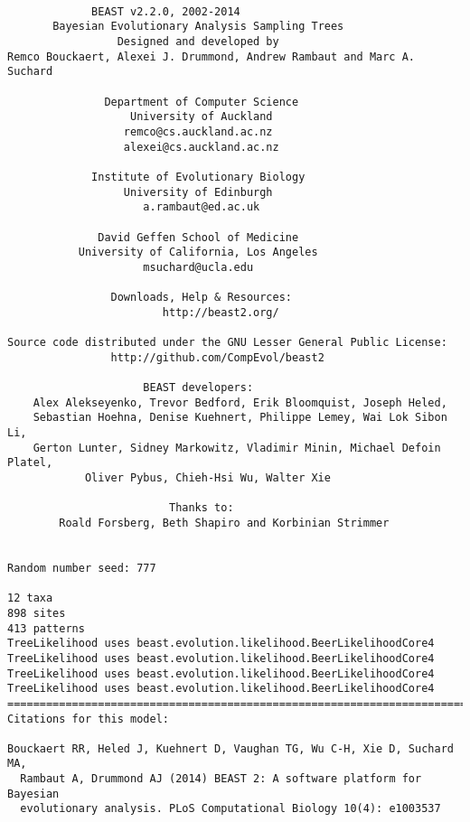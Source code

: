 \documentclass[12pt]{article}
\begin{document}
{\tiny   
\begin{verbatim}

             BEAST v2.2.0, 2002-2014
       Bayesian Evolutionary Analysis Sampling Trees
                 Designed and developed by
Remco Bouckaert, Alexei J. Drummond, Andrew Rambaut and Marc A. Suchard
                              
               Department of Computer Science
                   University of Auckland
                  remco@cs.auckland.ac.nz
                  alexei@cs.auckland.ac.nz
                              
             Institute of Evolutionary Biology
                  University of Edinburgh
                     a.rambaut@ed.ac.uk
                              
              David Geffen School of Medicine
           University of California, Los Angeles
                     msuchard@ucla.edu
                              
                Downloads, Help & Resources:
                    	http://beast2.org/
                              
Source code distributed under the GNU Lesser General Public License:
             	http://github.com/CompEvol/beast2
                              
                     BEAST developers:
	Alex Alekseyenko, Trevor Bedford, Erik Bloomquist, Joseph Heled, 
	Sebastian Hoehna, Denise Kuehnert, Philippe Lemey, Wai Lok Sibon Li, 
	Gerton Lunter, Sidney Markowitz, Vladimir Minin, Michael Defoin Platel, 
          	Oliver Pybus, Chieh-Hsi Wu, Walter Xie
                              
                         Thanks to:
    	Roald Forsberg, Beth Shapiro and Korbinian Strimmer


Random number seed: 777

12 taxa
898 sites
413 patterns
TreeLikelihood uses beast.evolution.likelihood.BeerLikelihoodCore4
TreeLikelihood uses beast.evolution.likelihood.BeerLikelihoodCore4
TreeLikelihood uses beast.evolution.likelihood.BeerLikelihoodCore4
TreeLikelihood uses beast.evolution.likelihood.BeerLikelihoodCore4
===============================================================================
Citations for this model:

Bouckaert RR, Heled J, Kuehnert D, Vaughan TG, Wu C-H, Xie D, Suchard MA,
  Rambaut A, Drummond AJ (2014) BEAST 2: A software platform for Bayesian
  evolutionary analysis. PLoS Computational Biology 10(4): e1003537


\end{verbatim}}
\end{document}
